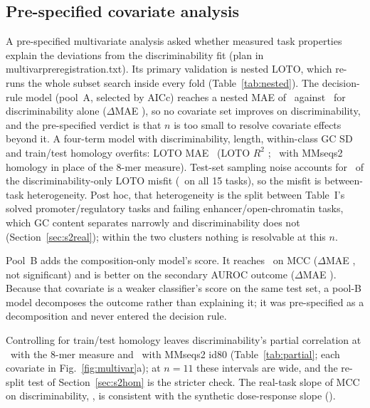 \documentclass[journal,onecolumn,10pt,letterpaper]{IEEEtran}
\newcommand{\tasku}{\textunderscore\allowbreak}
\DeclareRobustCommand{\task}[1]{{\normalfont\ttfamily\upshape\let\_\tasku #1}}
\begin{document}


\subsection{Pre-specified covariate analysis}
A pre-specified multivariate analysis asked whether measured task properties explain the deviations
from the discriminability fit (plan in \task{multivar\_preregistration.txt}). Its primary validation
is nested LOTO, which re-runs the whole subset search inside every fold (Table~\ref{tab:nested}). The
decision-rule model (pool~A, selected by AICc) reaches a nested MAE of \smNestMAE\ against \smDiscMAE\
for discriminability alone ($\Delta$MAE \smNestdMAE), so no covariate set improves on discriminability,
and the pre-specified verdict is that $n$ is too small to resolve covariate effects beyond it. A
four-term model with discriminability, length, within-class GC SD and train/test homology overfits: LOTO MAE \smRevMAE\ (LOTO $R^2$ \smRevRsq; \smRevMAEmm\ with MMseqs2 homology in
place of the 8-mer measure). Test-set sampling noise accounts for \smNoiseEleven\ of the
discriminability-only LOTO misfit (\smNoiseFifteen\ on all 15 tasks), so the misfit is between-task
heterogeneity. Post hoc, that heterogeneity is the split between Table~I's solved promoter/regulatory
tasks and failing enhancer/open-chromatin tasks, which GC content separates narrowly and discriminability does not
(Section~\ref{sec:s2real}); within the two clusters nothing is resolvable at this $n$.

Pool~B adds the composition-only model's score. It reaches \smPoolBMAE\ on MCC ($\Delta$MAE
\smPoolBdMAE, not significant) and is better on the secondary AUROC outcome ($\Delta$MAE
\smPoolBYtwo). Because that covariate is a weaker classifier's score on the same test set, a pool-B
model decomposes the outcome rather than explaining it; it was pre-specified as a decomposition and
never entered the decision rule.

Controlling for train/test homology leaves discriminability's partial correlation at \smPartialHom\
with the 8-mer measure and \smPartialMM\ with MMseqs2 id80 (Table~\ref{tab:partial}; each covariate in
Fig.~\ref{fig:multivar}a); at $n=11$ these
intervals are wide, and the re-split test of Section~\ref{sec:s2hom} is the stricter check.
The real-task slope of MCC on discriminability, \smSlopeReal, is consistent with the synthetic
dose-response slope (\smSlopeSyn).



\end{document}
